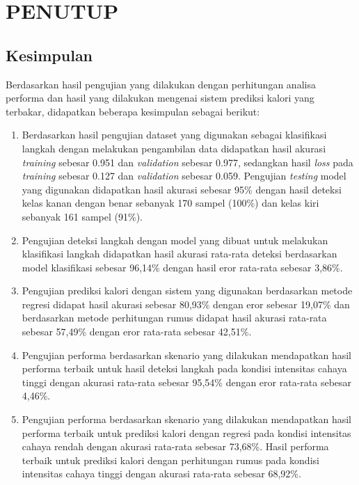 \chapter{PENUTUP}
\label{chap:penutup}


\section{Kesimpulan}
\label{sec:kesimpulan}

Berdasarkan hasil pengujian yang dilakukan dengan perhitungan analisa performa dan hasil yang dilakukan mengenai sistem prediksi kalori yang terbakar, didapatkan beberapa kesimpulan sebagai berikut:

\begin{enumerate}[nolistsep]

  \item Berdasarkan hasil pengujian dataset yang digunakan sebagai klasifikasi langkah dengan melakukan pengambilan data didapatkan hasil akurasi \emph{training} sebesar 0.951 dan \emph{validation} sebesar 0.977, sedangkan hasil \emph{loss} pada \emph{training} sebesar 0.127 dan \emph{validation} sebesar 0.059. Pengujian \emph{testing} model yang digunakan didapatkan hasil akurasi sebesar 95\% dengan hasil deteksi kelas kanan dengan benar sebanyak 170 sampel (100\%) dan kelas kiri sebanyak 161 sampel (91\%).

  \item Pengujian deteksi langkah dengan model yang dibuat untuk melakukan klasifikasi langkah didapatkan hasil akurasi rata-rata deteksi berdasarkan model klasifikasi sebesar 96,14\% dengan hasil eror rata-rata sebesar 3,86\%.
  
  \item Pengujian prediksi kalori dengan sistem yang digunakan berdasarkan metode regresi didapat hasil akurasi sebesar 80,93\% dengan eror sebesar 19,07\% dan berdasarkan metode perhitungan rumus didapat hasil akurasi rata-rata sebesar 57,49\% dengan eror rata-rata sebesar 42,51\%.
  
  \item Pengujian performa berdasarkan skenario yang dilakukan mendapatkan hasil performa terbaik untuk hasil deteksi langkah pada kondisi intensitas cahaya tinggi dengan akurasi rata-rata sebesar 95,54\% dengan eror rata-rata sebesar 4,46\%.
  
  \item Pengujian performa berdasarkan skenario yang dilakukan mendapatkan hasil performa terbaik untuk prediksi kalori dengan regresi pada kondisi intensitas cahaya rendah dengan akurasi rata-rata sebesar 73,68\%. Hasil performa terbaik untuk prediksi kalori dengan perhitungan rumus pada kondisi intensitas cahaya tinggi dengan akurasi rata-rata sebesar 68,92\%.
  

\end{enumerate}
